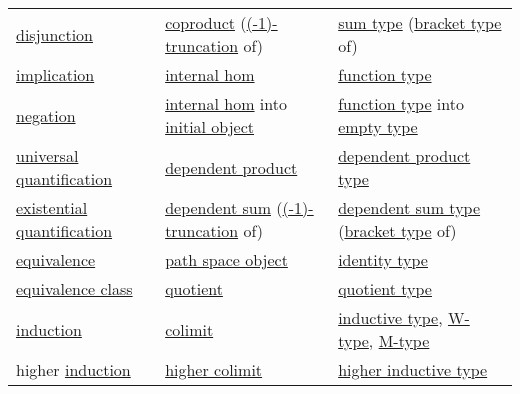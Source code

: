 \documentclass[a4paper,14pt,oneside]{book}
\begin{document}
\begin{longtable}{lll}
\href{https://ncatlab.org/nlab/show/disjunction}{disjunction} & \href{https://ncatlab.org/nlab/show/coproduct}{coproduct} (\href{https://ncatlab.org/nlab/show/\%28-1\%29-truncation}{(-1)-truncation} of) & \href{https://ncatlab.org/nlab/show/sum+type}{sum type} (\href{https://ncatlab.org/nlab/show/bracket+type}{bracket type} of)\\
\href{https://ncatlab.org/nlab/show/implication}{implication} & \href{https://ncatlab.org/nlab/show/internal+hom}{internal hom} & \href{https://ncatlab.org/nlab/show/function+type}{function type}\\
\href{https://ncatlab.org/nlab/show/negation}{negation} & \href{https://ncatlab.org/nlab/show/internal+hom}{internal hom} into \href{https://ncatlab.org/nlab/show/initial+object}{initial object} & \href{https://ncatlab.org/nlab/show/function+type}{function type} into \href{https://ncatlab.org/nlab/show/empty+type}{empty type}\\
\href{https://ncatlab.org/nlab/show/universal+quantification}{universal quantification} & \href{https://ncatlab.org/nlab/show/dependent+product}{dependent product} & \href{https://ncatlab.org/nlab/show/dependent+product+type}{dependent product type}\\
\href{https://ncatlab.org/nlab/show/existential+quantification}{existential quantification} & \href{https://ncatlab.org/nlab/show/dependent+sum}{dependent sum} (\href{https://ncatlab.org/nlab/show/\%28-1\%29-truncation}{(-1)-truncation} of) & \href{https://ncatlab.org/nlab/show/dependent+sum+type}{dependent sum type} (\href{https://ncatlab.org/nlab/show/bracket+type}{bracket type} of)\\
\href{https://ncatlab.org/nlab/show/equivalence}{equivalence} & \href{https://ncatlab.org/nlab/show/path+space+object}{path space object} & \href{https://ncatlab.org/nlab/show/identity+type}{identity type}\\
\href{https://ncatlab.org/nlab/show/equivalence+class}{equivalence class} & \href{https://ncatlab.org/nlab/show/quotient}{quotient} & \href{https://ncatlab.org/nlab/show/quotient+type}{quotient type}\\
\href{https://ncatlab.org/nlab/show/induction}{induction} & \href{https://ncatlab.org/nlab/show/colimit}{colimit} & \href{https://ncatlab.org/nlab/show/inductive+type}{inductive type}, \href{https://ncatlab.org/nlab/show/W-type}{W-type}, \href{https://ncatlab.org/nlab/show/M-type}{M-type}\\
higher \href{https://ncatlab.org/nlab/show/induction}{induction} & \href{https://ncatlab.org/nlab/show/\%28infinity\%2C1\%29-colimit}{higher colimit} & \href{https://ncatlab.org/nlab/show/higher+inductive+type}{higher inductive type}\\

\end{longtable}
\end{document}
